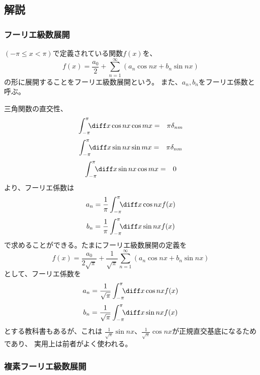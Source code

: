 \subsection{解説}

\subsubsection{フーリエ級数展開}

$(-\pi \le x < \pi)$で定義されている関数$f(x)$を、
$$
  f(x) = \frac{a_0}{2} + \sum_{n=1}^\infty (a_n \cos nx + b_n \sin nx)
$$
の形に展開することをフーリエ級数展開という。
また、$a_n, b_n$をフーリエ係数と呼ぶ。

三角関数の直交性、
\begin{eqnarray}
  \int_{-\pi}^{\pi} \!\!\! \diff x \cos nx \cos mx &=& \pi \delta_{nm}
\end{eqnarray}
\begin{eqnarray}
  \int_{-\pi}^{\pi} \!\!\! \diff x \sin nx \sin mx &=& \pi \delta_{nm}
\end{eqnarray}
\begin{eqnarray}
  \int_{-\pi}^{\pi} \!\!\! \diff x \sin nx \cos mx &=& 0
\end{eqnarray}
より、フーリエ係数は
\begin{eqnarray}
  a_n = \frac{1}{ \pi} \int_{-\pi}^{\pi} \!\!\! \diff x \cos nx f(x)
\end{eqnarray}
\begin{eqnarray}
  b_n = \frac{1}{ \pi} \int_{-\pi}^{\pi} \!\!\! \diff x \sin nx f(x)
\end{eqnarray}
で求めることができる。たまにフーリエ級数展開の定義を
$$
  f(x) = \frac{a_0}{2\sqrt{\pi}} + \frac{1}{\sqrt{\pi}}\sum_{n=1}^\infty (a_n \cos nx + b_n \sin nx)
$$
として、フーリエ係数を
\begin{eqnarray}
  a_n = \frac{1}{ \sqrt{\pi}} \int_{-\pi}^{\pi} \!\!\! \diff x \cos nx f(x)
\end{eqnarray}
\begin{eqnarray}
  b_n = \frac{1}{\sqrt{\pi}} \int_{-\pi}^{\pi} \!\!\! \diff x \sin nx f(x)
\end{eqnarray}
とする教科書もあるが、これは
$\displaystyle \frac{1}{\sqrt{\pi}} \sin nx$、$\displaystyle \frac{1}{\sqrt{\pi}} \cos nx$が正規直交基底になるためであり、
実用上は前者がよく使われる。

\subsubsection{複素フーリエ級数展開}

